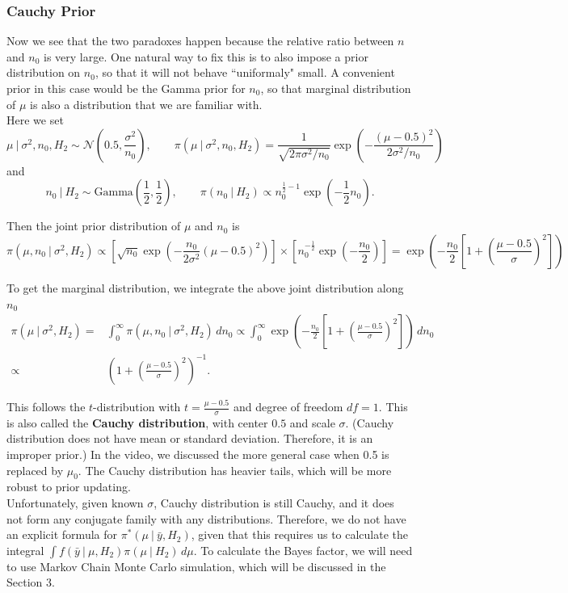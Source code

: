 \documentclass{article}
\def\dsst{\displaystyle}
\begin{document}
\subsubsection*{Cauchy Prior}

Now we see that the two paradoxes happen because the relative ratio between $n$ and $n_0$ is very large. One natural way to fix this is to also impose a prior distribution on $n_0$, so that it will not behave ``uniformaly" small. A convenient prior in this case would be the Gamma prior for $n_0$, so that marginal distribution of $\mu$ is also a distribution that we are familiar with.\\

Here we set
$$ \mu~|~\sigma^2, n_0, H_2 \sim \mathcal{N}(0.5, \frac{\sigma^2}{n_0}), \qquad \pi(\mu~|~\sigma^2, n_0, H_2) = \frac{1}{\sqrt{2\pi\sigma^2/n_0}}\exp\left(-\frac{(\mu-0.5)^2}{2\sigma^2/n_0}\right) $$
and
$$ n_0 ~|~ H_2\sim \text{Gamma}(\frac{1}{2}, \frac{1}{2}),\qquad \pi(n_0~|~H_2) \propto n_0^{\frac{1}{2}-1}\exp\left(-\frac{1}{2}n_0\right). $$

Then the joint prior distribution of $\mu$ and $n_0$ is
$$ \pi(\mu, n_0~|~\sigma^2, H_2) \propto \left[\sqrt{n_0}\exp\left(-\frac{n_0}{2\sigma^2}(\mu-0.5)^2\right)\right]\times\left[n_0^{-\frac{1}{2}}\exp\left(-\frac{n_0}{2}\right)\right] = \exp\left(-\frac{n_0}{2}\left[1+\left(\frac{\mu - 0.5}{\sigma}\right)^2\right]\right)$$

To get the marginal distribution, we integrate the above joint distribution along $n_0$
\begin{align*}
\pi (\mu~|~\sigma^2, H_2) = & \int_0^\infty \pi(\mu, n_0~|~\sigma^2, H_2)\, dn_0 \propto \int_0^\infty \exp\left(-\frac{n_0}{2}\left[1+\left(\frac{\mu - 0.5}{\sigma}\right)^2\right]\right)\, dn_0 \\
\propto & \left(1 + \left(\frac{\mu-0.5}{\sigma}\right)^2\right)^{-1}.  
\end{align*}

This follows the $t$-distribution with $t = \dsst \frac{\mu-0.5}{\sigma}$ and degree of freedom $df = 1$. This is also called the \textbf{Cauchy distribution}, with center $0.5$ and scale $\sigma$. (Cauchy distribution does not have mean or standard deviation. Therefore, it is an improper prior.) In the video, we discussed the more general case when 0.5 is replaced by $\mu_0$. The Cauchy distribution has heavier tails, which will be more robust to prior updating. \\

Unfortunately, given known $\sigma$, Cauchy distribution is still Cauchy, and it does not form any conjugate family with any distributions. Therefore, we do not have an explicit formula for $\pi^*(\mu~|~\bar{y}, H_2)$, given that this requires us to calculate the integral $\dsst \int f(\bar{y}~|~\mu, H_2)\pi(\mu~|~H_2)\, d\mu$. To calculate the Bayes factor, we will need to use Markov Chain Monte Carlo simulation, which will be discussed in the Section 3.
\end{document}
